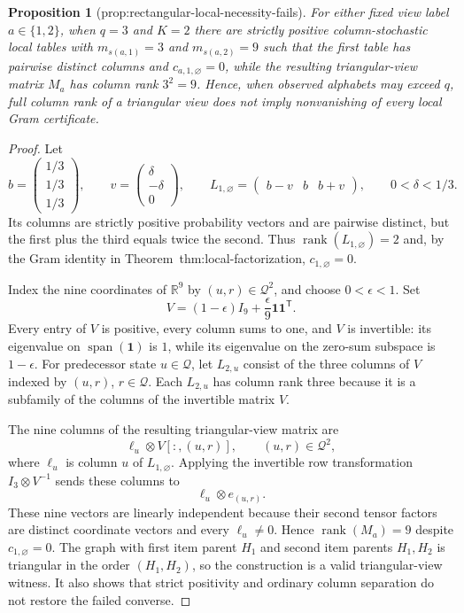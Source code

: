 \documentclass{article}
\newtheorem{proposition}{Proposition}
\begin{document}
\begin{proposition}[prop:rectangular-local-necessity-fails]\label{prop:rectangular-local-necessity-fails}
For either fixed view label \(a\in\{1,2\}\), when \(q=3\) and \(K=2\) there are strictly positive column-stochastic local tables with \(m_{s(a,1)}=3\) and \(m_{s(a,2)}=9\) such that the first table has pairwise distinct columns and \(c_{a,1,\varnothing}=0\), while the resulting triangular-view matrix \(M_a\) has column rank \(3^2=9\).  Hence, when observed alphabets may exceed \(q\), full column rank of a triangular view does not imply nonvanishing of every local Gram certificate.
\end{proposition}
\begin{proof}
Let
\[
 b=\begin{pmatrix}1/3\\1/3\\1/3\end{pmatrix},
 \qquad
 v=\begin{pmatrix}\delta\\-\delta\\0\end{pmatrix},
 \qquad
 L_{1,\varnothing}=\begin{pmatrix}b-v&b&b+v\end{pmatrix},
 \qquad 0<\delta<1/3.
\]
Its columns are strictly positive probability vectors and are pairwise distinct, but the first plus the third equals twice the second.  Thus \(\operatorname{rank}(L_{1,\varnothing})=2\) and, by the Gram identity in Theorem~\textnormal{thm:local-factorization}, \(c_{1,\varnothing}=0\).

Index the nine coordinates of \(\mathbb R^9\) by \((u,r)\in\mathcal Q^2\), and choose \(0<\epsilon<1\).  Set
\[
 V=(1-\epsilon)I_9+\frac{\epsilon}{9}\mathbf1\mathbf1^{\mathsf T}.
\]
Every entry of \(V\) is positive, every column sums to one, and \(V\) is invertible: its eigenvalue on \(\operatorname{span}(\mathbf1)\) is \(1\), while its eigenvalue on the zero-sum subspace is \(1-\epsilon\).  For predecessor state \(u\in\mathcal Q\), let \(L_{2,u}\) consist of the three columns of \(V\) indexed by \((u,r)\), \(r\in\mathcal Q\).  Each \(L_{2,u}\) has column rank three because it is a subfamily of the columns of the invertible matrix \(V\).

The nine columns of the resulting triangular-view matrix are
\[
 \ell_u\otimes V[:,(u,r)],
 \qquad (u,r)\in\mathcal Q^2,
\]
where \(\ell_u\) is column \(u\) of \(L_{1,\varnothing}\).  Applying the invertible row transformation \(I_3\otimes V^{-1}\) sends these columns to
\[
 \ell_u\otimes e_{(u,r)}.
\]
These nine vectors are linearly independent because their second tensor factors are distinct coordinate vectors and every \(\ell_u\neq0\).  Hence \(\operatorname{rank}(M_a)=9\) despite \(c_{1,\varnothing}=0\).  The graph with first item parent \(H_1\) and second item parents \(H_1,H_2\) is triangular in the order \((H_1,H_2)\), so the construction is a valid triangular-view witness.  It also shows that strict positivity and ordinary column separation do not restore the failed converse.
\end{proof}
\end{document}
